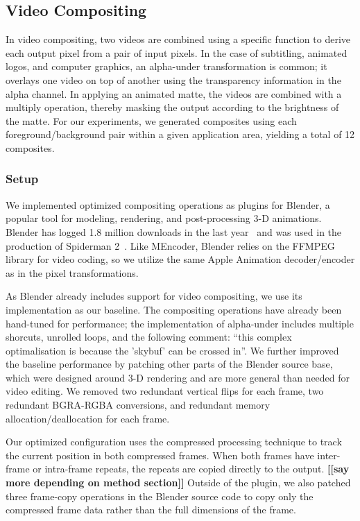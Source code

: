 \subsection{Video Compositing}

In video compositing, two videos are combined using a specific
function to derive each output pixel from a pair of input pixels.  In
the case of subtitling, animated logos, and computer graphics, an
alpha-under transformation is common; it overlays one video on top of
another using the transparency information in the alpha channel.  In
applying an animated matte, the videos are combined with a multiply
operation, thereby masking the output according to the brightness of
the matte.  For our experiments, we generated composites using each
foreground/background pair within a given application area, yielding a
total of 12 composites.

\subsubsection{Setup}

We implemented optimized compositing operations as plugins for
Blender, a popular tool for modeling, rendering, and post-processing
3-D animations.  Blender has logged 1.8 million downloads in the last
year~\cite{blender-stats} and was used in the production of Spiderman
2~\cite{blender-wikipedia}.  Like MEncoder, Blender relies on the
FFMPEG library for video coding, so we utilize the same Apple
Animation decoder/encoder as in the pixel transformations.

As Blender already includes support for video compositing, we use its
implementation as our baseline.  The compositing operations have
already been hand-tuned for performance; the implementation of
alpha-under includes multiple shorcuts, unrolled loops, and the
following comment: ``this complex optimalisation is because the
'skybuf' can be crossed in''.  We further improved the baseline
performance by patching other parts of the Blender source base, which
were designed around 3-D rendering and are more general than needed
for video editing.  We removed two redundant vertical flips for each
frame, two redundant BGRA-RGBA conversions, and redundant memory
allocation/deallocation for each frame.

Our optimized configuration uses the compressed processing technique
to track the current position in both compressed frames.  When both
frames have inter-frame or intra-frame repeats, the repeats are copied
directly to the output.  {\bf [[say more depending on method
section]]} Outside of the plugin, we also patched three frame-copy
operations in
the Blender source code to copy only the compressed frame data rather
than the full dimensions of the frame.

